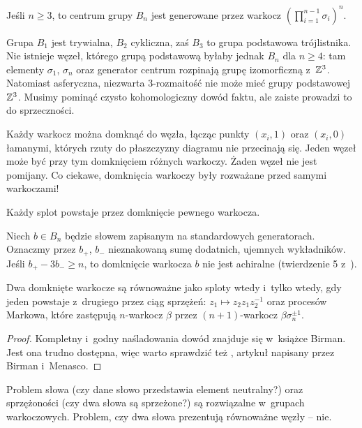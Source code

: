 \begin{proposition}
    Jeśli $n \ge 3$, to centrum grupy $B_n$ jest generowane
    przez warkocz $(\prod_{i = 1}^{n-1} \sigma_i)^n$.
\end{proposition}

Grupa $B_1$ jest trywialna, $B_2$ cykliczna, zaś $B_3$ to grupa podstawowa trójlistnika.
Nie istnieje węzeł, którego grupą podstawową byłaby jednak $B_n$ dla $n \ge 4$: tam elementy $\sigma_1$, $\sigma_n$ oraz generator centrum rozpinają grupę izomorficzną z~$\mathbb Z^3$.
Natomiast asferyczna, niezwarta 3-rozmaitość nie może mieć grupy podstawowej $\mathbb Z^3$.
Musimy pominąć czysto kohomologiczny dowód faktu, ale zaiste prowadzi to do sprzeczności.

Każdy warkocz można domknąć do węzła, łącząc punkty $(x_i, 1)$ oraz $(x_i, 0)$
łamanymi, których rzuty do płaszczyzny diagramu nie przecinają się.
Jeden węzeł może być przy tym domknięciem różnych warkoczy.
Żaden węzeł nie jest pomijany.
Co ciekawe, domknięcia warkoczy były rozważane przed samymi warkoczami!

\begin{theorem}[Alexander, 1923] \label{alex_thm}
     Każdy splot powstaje przez domknięcie pewnego warkocza.
\end{theorem}

Niech $b \in B_n$ będzie słowem zapisanym na standardowych generatorach.
Oznaczmy przez $b_+$, $b_-$ nieznakowaną sumę dodatnich, ujemnych wykładników.
Jeśli $b_+ - 3b_- \ge n$, to domknięcie warkocza $b$ nie jest achiralne (twierdzenie 5 z~\cite{jones85}).

\begin{theorem}[Markow, 1936]
    Dwa domknięte warkocze są równoważne jako sploty wtedy i~tylko wtedy,
    gdy jeden powstaje z~drugiego przez ciąg
    sprzężeń: $z_1 \mapsto z_2 z_1 z_2^{-1}$ oraz procesów Markowa,
    które zastępują $n$-warkocz $\beta$ przez $(n+1)$-warkocz $\beta\sigma_n^{\pm 1}$.
\end{theorem}

\begin{proof}
    Kompletny i~godny naśladowania dowód znajduje się w~książce \cite{birman74} Birman.
    Jest ona trudno dostępna, więc warto sprawdzić też \cite{birman02}, artykuł napisany przez Birman i~Menasco.
\end{proof}

Problem słowa (czy dane słowo przedstawia element neutralny?) oraz sprzężoności (czy dwa słowa są sprzeżone?) są rozwiązalne w~grupach warkoczowych.
Problem, czy dwa słowa prezentują równoważne węzły -- nie.

